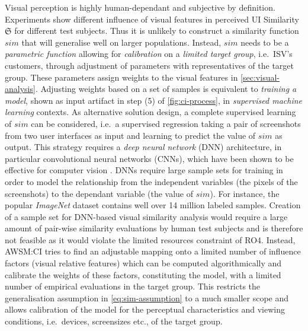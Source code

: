Visual perception is highly human-dependant and subjective by definition.
Experiments show different influence of visual features in perceived UI Similarity \(\mathfrak{S}\) for different test subjects.
Thus it is unlikely to construct a similarity function \(sim\) that will generalise well on larger populations.
Instead, \(sim\) needs to be a \emph{parametric function} allowing for \emph{calibration} on a \emph{limited target group}, i.e.~ISV's customers, through adjustment of parameters with representatives of the target group.
These parameters assign weights to the visual features in \cref{sec:visual-analysis}.
Adjusting weights based on a set of samples is equivalent to \emph{training a model}, shown as input artifact in step (5) of \cref{fig:ci-process}, in \emph{supervised machine learning} contexts.
As alternative solution design, a complete supervised learning of \(sim\) can be considered, i.e.~a supervised regression taking a pair of screenshots from two user interfaces as input and learning to predict the value of \(sim\) as output.
This strategy requires a \emph{deep neural network} (DNN) architecture, in particular convolutional neural networks (CNNs), which have been shown to be effective for computer vision \autocite{Liu2017DNNSurvey}.
DNNs require large sample sets for training \autocite{Liu2017DNNSurvey} in order to model the relationship from the independent variables (the pixels of the screenshots) to the dependant variable (the value of \(sim\)).
For instance, the popular \emph{ImageNet} dataset \autocite{Deng2009} contains well over 14 million labeled samples.
Creation of a sample set for DNN-based visual similarity analysis would require a large amount of pair-wise similarity evaluations by human test subjects and is therefore not feasible as it would violate the limited resources constraint of RO4.
Instead, AWSM:CI tries to find an adjustable mapping onto a limited number of influence factors (visual relative features) which can be computed algorithmically and calibrate the weights of these factors, constituting the model, with a limited number of empirical evaluations in the target group.
This restricts the generalisation assumption in \cref{eq:sim-assumption} to a much smaller scope and allows calibration of the model for the perceptual characteristics and viewing conditions, i.e.~devices, screensizes etc., of the target group.

